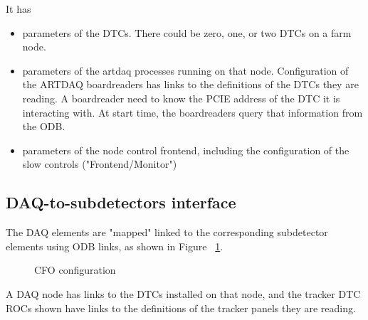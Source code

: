 It has
\begin{itemize}
\item
  parameters of the DTCs. There could be zero, one, or two DTCs on a farm node.
\item
  parameters of the artdaq processes running on that node.
  Configuration of the ARTDAQ boardreaders has links to the definitions
  of the DTCs they are reading. A boardreader need to know the PCIE address of the DTC
  it is interacting with. At start time, the boardreaders query that information
  from the ODB.
  
\item
  parameters of the node control frontend, including the configuration of the
  slow controls ("Frontend/Monitor")
\end{itemize}

\subsection{DAQ-to-subdetectors interface}
The DAQ elements are "mapped" linked to the corresponding subdetector elements using ODB links,
as shown in Figure ~\ref{figure:daq_to_tracker_interface}.
\begin{figure}[H]
  \caption{
    \label{figure:daq_to_tracker_interface}
    CFO configuration
  }
\end{figure}

A DAQ node has links to the DTCs installed on that node, and the tracker DTC ROCs shown have
links to the definitions of the tracker panels they are reading.

